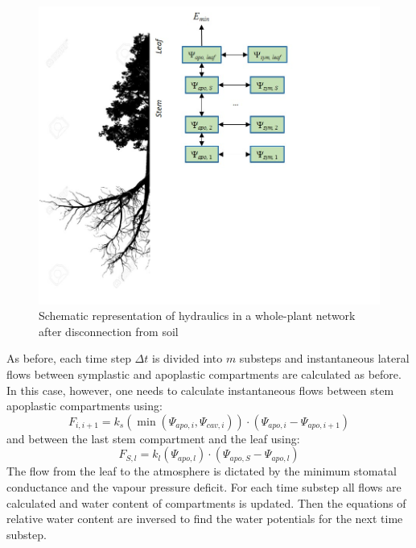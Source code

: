 \documentclass[]{book}
\begin{document}
\begin{figure}

{\centering \includegraphics[width=0.8\linewidth]{hydraulics_disc} 

}

\caption{Schematic representation of hydraulics in a whole-plant network after disconnection from soil}\label{fig:unnamed-chunk-70}
\end{figure}

As before, each time step \(\Delta t\) is divided into \(m\) substeps and instantaneous lateral flows between symplastic and apoplastic compartments are calculated as before. In this case, however, one needs to calculate instantaneous flows between stem apoplastic compartments using:
\begin{equation}
F_{i, i+1} = k_{s}(\min(\Psi_{apo,i}, \Psi_{cav, i})) \cdot (\Psi_{apo, i} - \Psi_{apo, i+1})
\end{equation}
and between the last stem compartment and the leaf using:
\begin{equation}
F_{S, l} = k_{l}(\Psi_{apo, l}) \cdot (\Psi_{apo, S} - \Psi_{apo, l})
\end{equation}
The flow from the leaf to the atmosphere is dictated by the minimum stomatal conductance and the vapour pressure deficit. For each time substep all flows are calculated and water content of compartments is updated. Then the equations of relative water content are inversed to find the water potentials for the next time substep.
\end{document}
